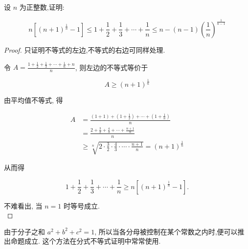 \begin{example}
	设 $n$ 为正整数,证明:
	
	$$
	n\left[(n+1)^{\frac{1}{n}}-1\right] \leqslant 1+\frac{1}{2}+\frac{1}{3}+\cdots+\frac{1}{n} \leqslant n-(n-1)\left(\frac{1}{n}\right)^{\frac{1}{n-1}}
	$$
\end{example}
\begin{proof}
	只证明不等式的左边,不等式的右边可同样处理.
	
	令 $A=\frac{1+\frac{1}{2}+\frac{1}{3}+\cdots+\frac{1}{n}+n}{n}$, 则左边的不等式等价于
	
	$$
	A \geqslant(n+1)^{\frac{1}{n}}
	$$
	
	由平均值不等式, 得
	
	$$
	\begin{aligned}
	A & =\frac{(1+1)+\left(1+\frac{1}{2}\right)+\cdots+\left(1+\frac{1}{n}\right)}{n} \\
	& =\frac{2+\frac{3}{2}+\frac{4}{3}+\cdots+\frac{n+1}{n}}{n} \\
	& \geqslant \sqrt[n]{2 \cdot \frac{3}{2} \cdot \frac{4}{3} \cdot \cdots \cdot \frac{n+1}{n}}=(n+1)^{\frac{1}{n}}
	\end{aligned}
	$$
	
	从而得
	
	$$
	1+\frac{1}{2}+\frac{1}{3}+\cdots+\frac{1}{n} \geqslant n\left[(n+1)^{\frac{1}{n}}-1\right] .
	$$
	
	不难看出, 当 $n=1$ 时等号成立.\\
\end{proof}
\begin{note}
	由于分子之和 $a^{2}+b^{2}+c^{2}=1$, 所以当各分母被控制在某个常数之内时,便可以推出命题成立. 这个方法在分式不等式证明中常常使用.
\end{note}

